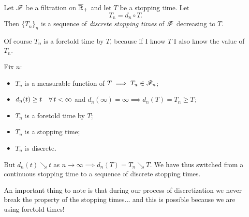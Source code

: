 \documentclass{report}
\begin{document}
\begin{proposition}
	Let $\mathscr{F}$ be a filtration on $\overline{\mathbb{R}}_+$ and let $T$ be a stopping time. Let 
	\[T_n=d_n\circ T.\]
	Then ${\{T_n\}}_{n}$ is a sequence of \emph{discrete stopping times} of $\mathscr{F}$ decreasing to $T$.
\end{proposition}
\begin{remark}
Of course $T_n$ is a foretold time by $T$, because if I know $T$ I also know the value of $T_n$.
\end{remark}
\begin{fancyproof}
	Fix $n$:
	\begin{itemize}
		\item $T_n$ is a measurable function of $T\implies T_n\in\mathscr{F}_n$;
		\item $d_n(t)\geq t\quad\forall\, t<\infty$ and $d_n(\infty)=\infty\implies d_n(T)=T_n\geq T$;
		\item $T_n$ is a foretold time by $T$;
		\item $T_n$ is a stopping time;
		\item $T_n$ is discrete.
	\end{itemize}
	But $d_n(t)\searrow t$ as $n\to\infty\implies d_n(T)=T_n\searrow T$. We have thus switched from a continuous stopping time to a sequence of discrete stopping times.
\end{fancyproof}
An important thing to note is that during our process of discretization we never break the property of the stopping times... and this is possible because we are using foretold times!
\end{document}

